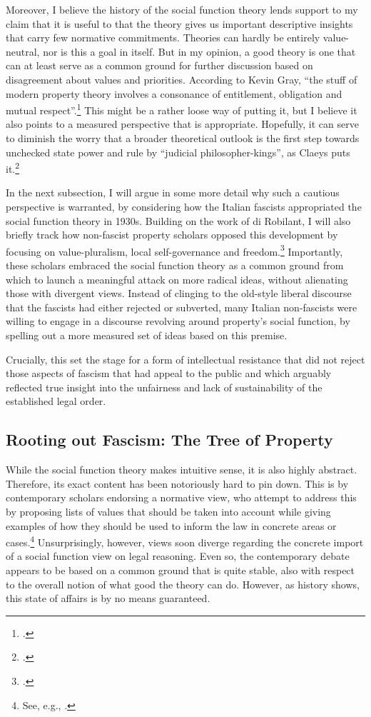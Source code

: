 Moreover, I believe the history of the social function theory lends support to my claim that it is useful to  that the theory gives us important descriptive insights that carry few normative commitments. Theories can hardly be entirely value-neutral, nor is this a goal in itself. But in my opinion, a good theory is one that can at least serve as a common ground for further discussion based on disagreement about values and priorities. According to Kevin Gray, ``the stuff of modern property theory involves a consonance of entitlement, obligation and mutual respect''.\footcite[37]{gray11} This might be a rather loose way of putting it, but I believe it also points to a measured perspective that is appropriate. Hopefully, it can serve to diminish the worry that a broader theoretical outlook is the first step towards unchecked state power and rule by ``judicial philosopher-kings'', as Claeys puts it.\footcite[944]{claeys09}

In the next subsection, I will argue in some more detail why such a cautious perspective is warranted, by considering how the Italian fascists appropriated the social function theory in 1930s. Building on the work of di Robilant, I will also briefly track how non-fascist property scholars opposed this development by focusing on value-pluralism, local self-governance and freedom.\footcite{robilant13} Importantly, these scholars embraced the social function theory as a common ground from which to launch a meaningful attack on more radical ideas, without alienating those with divergent views. Instead of clinging to the old-style liberal discourse that the fascists had either rejected or subverted, many Italian non-fascists were willing to engage in a discourse revolving around property's social function, by spelling out a more measured set of ideas based on this premise. 

Crucially, this set the stage for a form of intellectual resistance that did not reject those aspects of fascism that had appeal to the public and which arguably reflected true insight into the unfairness and lack of sustainability of the established legal order.

\subsection{Rooting out Fascism: {T}he Tree of Property}

While the social function theory makes intuitive sense, it is also highly abstract. Therefore, its exact content has been notoriously hard to pin down. This is  by contemporary scholars endorsing a normative view, who attempt to address this by proposing lists of values that should be taken into account while giving examples of how they should be used to inform the law in concrete areas or cases.\footnote{See, e.g., \cite{alexander14,alexander11,dagan07}.} Unsurprisingly, however, views soon diverge regarding the concrete import of a social function view on legal reasoning. Even so, the contemporary debate appears to be based on a common ground that is quite stable, also with respect to the overall notion of what good the theory can do. However, as history shows, this state of affairs is by no means guaranteed.

